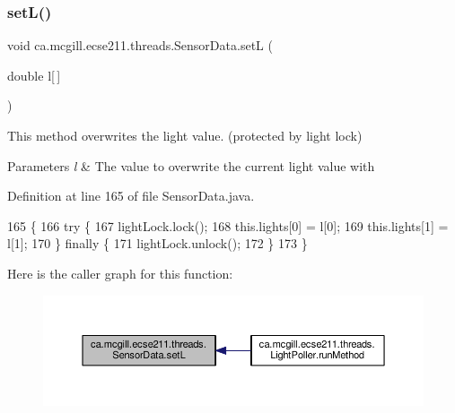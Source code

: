 \subsubsection{\texorpdfstring{set\+L()}{setL()}}
{\footnotesize\ttfamily void ca.\+mcgill.\+ecse211.\+threads.\+Sensor\+Data.\+setL (\begin{DoxyParamCaption}\item[{double}]{l\mbox{[}$\,$\mbox{]} }\end{DoxyParamCaption})}

This method overwrites the light value. (protected by light lock)


\begin{DoxyParams}{Parameters}
{\em l} & The value to overwrite the current light value with \\
\hline
\end{DoxyParams}


Definition at line 165 of file Sensor\+Data.\+java.


\begin{DoxyCode}
165                                \{
166     \textcolor{keywordflow}{try} \{
167       lightLock.lock();
168       this.lights[0] = l[0];
169       this.lights[1] = l[1];
170     \} \textcolor{keywordflow}{finally} \{
171       lightLock.unlock();
172     \}
173   \}
\end{DoxyCode}
Here is the caller graph for this function\+:\nopagebreak
\begin{figure}[H]
\begin{center}
\leavevmode
\includegraphics[width=350pt]{classca_1_1mcgill_1_1ecse211_1_1threads_1_1_sensor_data_af905a6f2825716ae1a39bf7f6be09477_icgraph}
\end{center}
\end{figure}
\mbox{\label{classca_1_1mcgill_1_1ecse211_1_1threads_1_1_sensor_data_a6ad23111ecd378099f0b4ed0b6d398bc}} 

